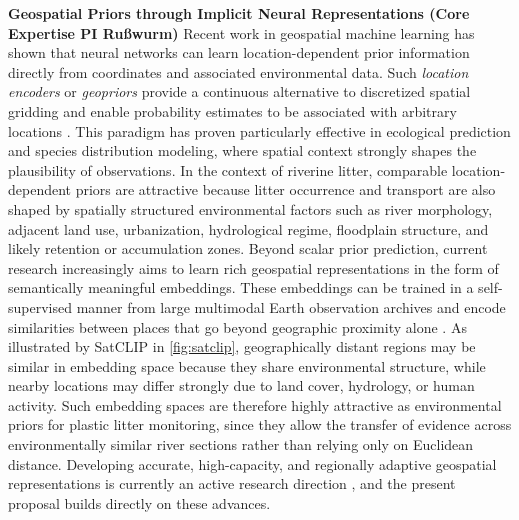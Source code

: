 \documentclass{scrartcl}
\begin{document}
\textbf{Geospatial Priors through Implicit Neural Representations (Core Expertise PI Ru{\ss}wurm)} Recent work in geospatial machine learning has shown that neural networks can learn location-dependent prior information directly from coordinates and associated environmental data. Such \emph{location encoders} or \emph{geopriors} provide a continuous alternative to discretized spatial gridding and enable probability estimates to be associated with arbitrary locations \citep{russwurm2024geographic,mac2019presence,cole2023spatial}. This paradigm has proven particularly effective in ecological prediction and species distribution modeling, where spatial context strongly shapes the plausibility of observations. In the context of riverine litter, comparable location-dependent priors are attractive because litter occurrence and transport are also shaped by spatially structured environmental factors such as river morphology, adjacent land use, urbanization, hydrological regime, floodplain structure, and likely retention or accumulation zones. Beyond scalar prior prediction, current research increasingly aims to learn rich geospatial representations in the form of semantically meaningful embeddings. These embeddings can be trained in a self-supervised manner from large multimodal Earth observation archives and encode similarities between places that go beyond geographic proximity alone . As illustrated by SatCLIP in \cref{fig:satclip}, geographically distant regions may be similar in embedding space because they share environmental structure, while nearby locations may differ strongly due to land cover, hydrology, or human activity. Such embedding spaces are therefore highly attractive as environmental priors for plastic litter monitoring, since they allow the transfer of evidence across environmentally similar river sections rather than relying only on Euclidean distance. Developing accurate, high-capacity, and regionally adaptive geospatial representations is currently an active research direction , and the present proposal builds directly on these advances.
\end{document}
